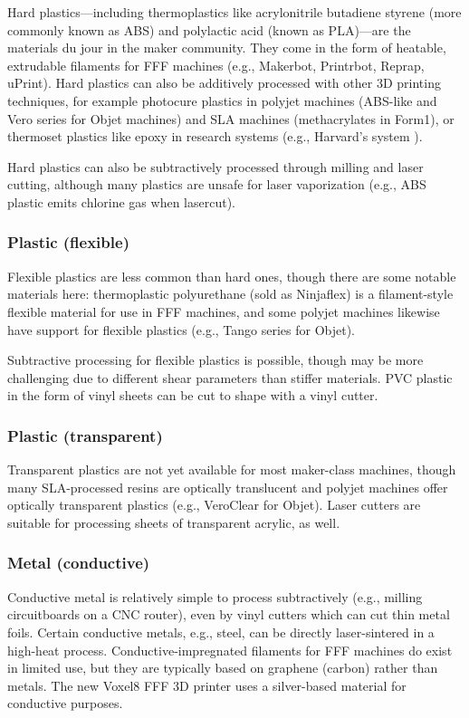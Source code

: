 Hard plastics---including thermoplastics like acrylonitrile butadiene styrene (more commonly known as ABS) and polylactic acid (known as PLA)---are the materials du jour in the maker community. They come in the form of heatable, extrudable filaments for FFF machines (e.g., Makerbot, Printrbot, Reprap, uPrint). Hard plastics can also be additively processed with other 3D printing techniques, for example photocure plastics in polyjet machines (ABS-like and Vero series for Objet machines) and SLA machines (methacrylates in Form1), or thermoset plastics like epoxy in research systems (e.g., Harvard's system \cite{compton-epoxy}).

Hard plastics can also be subtractively processed through milling and laser cutting, although many plastics are unsafe for laser vaporization (e.g., ABS plastic emits chlorine gas when lasercut).

\subsubsection{Plastic (flexible)}

Flexible plastics are less common than hard ones, though there are some notable materials here: thermoplastic polyurethane (sold as Ninjaflex) is a filament-style flexible material for use in FFF machines, and some polyjet machines likewise have support for flexible plastics (e.g., Tango series for Objet).

Subtractive processing for flexible plastics is possible, though may be more challenging due to different shear parameters than stiffer materials. PVC plastic in the form of vinyl sheets can be cut to shape with a vinyl cutter.

\subsubsection{Plastic (transparent)}

Transparent plastics are not yet available for most maker-class machines, though many SLA-processed resins are optically translucent and polyjet machines offer optically transparent plastics (e.g., VeroClear for Objet). Laser cutters are suitable for processing sheets of transparent acrylic, as well.

\subsubsection{Metal (conductive)}

Conductive metal is relatively simple to process subtractively (e.g., milling circuitboards on a CNC router), even by vinyl cutters which can cut thin metal foils. Certain conductive metals, e.g., steel, can be directly laser-sintered in a high-heat process. Conductive-impregnated filaments for FFF machines do exist in limited use, but they are typically based on graphene (carbon) rather than metals. The new Voxel8 FFF 3D printer \cite{voxel8} uses a silver-based material for conductive purposes.

